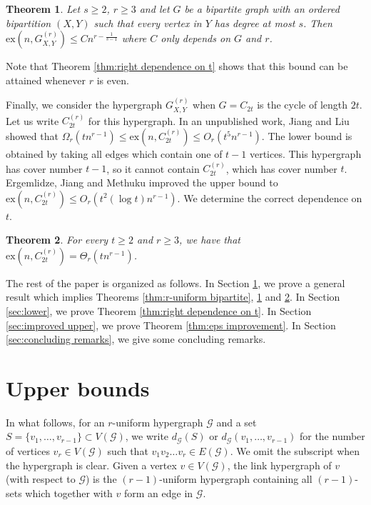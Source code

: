 \documentclass[a4paper,11pt]{article}
\newtheorem{theorem}{\bf Theorem}[section]
\theoremstyle{definition}
\def\cG{\mathcal{G}}
\def\ex{\mathrm{ex}}
\begin{document}
\begin{theorem}\label{thm:degree-s on one side}
     Let $s\geq 2$, $r\geq 3$ and let $G$ be a bipartite graph with an ordered bipartition $(X,Y)$ such that every vertex in $Y$ has degree at most $s$. Then $\ex(n,G_{X,Y}^{(r)})\leq Cn^{r-\frac{1}{s-1}}$ where $C$ only depends on $G$ and $r$.
\end{theorem}

\noindent Note that Theorem \ref{thm:right dependence on t} shows that this bound can be attained whenever $r$ is even.

Finally, we consider the hypergraph $G_{X,Y}^{(r)}$ when $G=C_{2t}$ is the cycle of length $2t$. Let us write $C_{2t}^{(r)}$ for this hypergraph. In an unpublished work, Jiang and Liu showed that $\Omega_r(tn^{r-1}) \leq \ex(n,C_{2t}^{(r)}) \leq O_r(t^5n^{r-1})$. The lower bound is obtained by taking all edges which contain one of $t-1$ vertices. This hypergraph has cover number $t-1$, so it cannot contain $C_{2t}^{(r)}$, which has cover number $t$. Ergemlidze, Jiang and Methuku \cite{EJM20} improved the upper bound to $\ex(n,C_{2t}^{(r)}) \leq O_r(t^2(\log t) n^{r-1})$. We determine the correct dependence on $t$.
\begin{theorem}\label{thm:cycle}
     For every $t \geq 2$ and $r \geq 3$, we have that $\ex(n,C_{2t}^{(r)}) = \Theta_r(tn^{r-1})$.
\end{theorem}

The rest of the paper is organized as follows. In Section \ref{sec:upper}, we prove a general result which implies Theorems \ref{thm:r-uniform bipartite}, \ref{thm:degree-s on one side} and \ref{thm:cycle}. In Section \ref{sec:lower}, we prove Theorem \ref{thm:right dependence on t}. In Section \ref{sec:improved upper}, we prove Theorem \ref{thm:eps improvement}. In Section \ref{sec:concluding remarks}, we give some concluding remarks.

\section{Upper bounds} \label{sec:upper}

In what follows, for an $r$-uniform hypergraph $\cG$ and a set $S=\{v_1,\dots,v_{r-1}\}\subset V(\cG)$, we write $d_{\cG}(S)$ or $d_{\cG}(v_1,\dots,v_{r-1})$ for the number of vertices $v_r\in V(\cG)$ such that $v_1v_2\dots v_r\in E(\cG)$. We omit the subscript when the hypergraph is clear. Given a vertex $v \in V(\cG)$, the link hypergraph of $v$ (with respect to $\cG$) is the $(r-1)$-uniform hypergraph containing all $(r-1)$-sets which together with $v$ form an edge in $\cG$.
\end{document}
